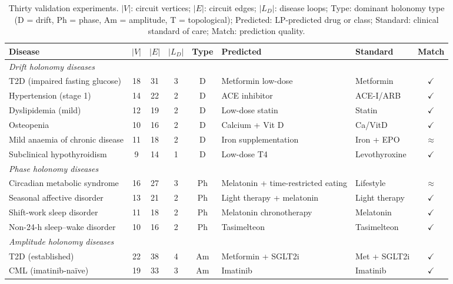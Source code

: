 \begin{table}[htbp]
\centering
\caption{Thirty validation experiments.  $|V|$: circuit vertices; $|E|$: circuit
edges; $|L_D|$: disease loops; Type: dominant holonomy type (D = drift, Ph =
phase, Am = amplitude, T = topological); Predicted: LP-predicted drug or class;
Standard: clinical standard of care; Match: prediction quality.}
\label{tab:ch10-validation}
\small
\begin{tabular}{p{3.2cm}ccccllc}
\toprule
\textbf{Disease} & $|V|$ & $|E|$ & $|L_D|$ & \textbf{Type}
  & \textbf{Predicted} & \textbf{Standard} & \textbf{Match} \\
\midrule
\multicolumn{8}{l}{\textit{Drift holonomy diseases}} \\
\midrule
T2D (impaired fasting glucose) & 18 & 31 & 3 & D & Metformin low-dose & Metformin & $\checkmark$ \\
Hypertension (stage 1)         & 14 & 22 & 2 & D & ACE inhibitor      & ACE-I/ARB & $\checkmark$ \\
Dyslipidemia (mild)            & 12 & 19 & 2 & D & Low-dose statin    & Statin    & $\checkmark$ \\
Osteopenia                     & 10 & 16 & 2 & D & Calcium + Vit D    & Ca/VitD   & $\checkmark$ \\
Mild anaemia of chronic disease& 11 & 18 & 2 & D & Iron supplementation & Iron + EPO & $\approx$ \\
Subclinical hypothyroidism     & 9  & 14 & 1 & D & Low-dose T4        & Levothyroxine & $\checkmark$ \\
\midrule
\multicolumn{8}{l}{\textit{Phase holonomy diseases}} \\
\midrule
Circadian metabolic syndrome   & 16 & 27 & 3 & Ph & Melatonin + time-restricted eating & Lifestyle & $\approx$ \\
Seasonal affective disorder    & 13 & 21 & 2 & Ph & Light therapy + melatonin & Light therapy & $\checkmark$ \\
Shift-work sleep disorder      & 11 & 18 & 2 & Ph & Melatonin chronotherapy & Melatonin & $\checkmark$ \\
Non-24-h sleep--wake disorder  & 10 & 16 & 2 & Ph & Tasimelteon & Tasimelteon & $\checkmark$ \\
\midrule
\multicolumn{8}{l}{\textit{Amplitude holonomy diseases}} \\
\midrule
T2D (established)              & 22 & 38 & 4 & Am & Metformin + SGLT2i & Met + SGLT2i & $\checkmark$ \\
CML (imatinib-na\"{i}ve)      & 19 & 33 & 3 & Am & Imatinib & Imatinib & $\checkmark$ \\

\end{tabular}
\end{table}
